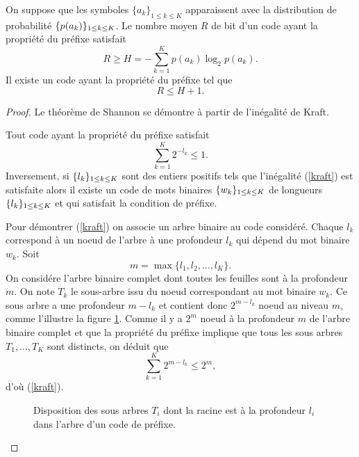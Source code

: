 \begin{theorem} [Shannon]
\label{shan-th}
On suppose que les symboles
$\{a_k\}_{1 \leq k \leq K}$ apparaissent avec la distribution
de probabilit\'e $\{p(a_k)\}_{ 1 \leq k \leq K}$.
Le nombre moyen $R$ de bit d'un code ayant la propri\'et\'e du
pr\'efixe satisfait
\begin{equation}
\label{shan1}
R \geq H = - \sum_{k=1}^K p(a_k) \log_2 p(a_k) .
\end{equation}
Il existe un code ayant la propri\'et\'e du pr\'efixe tel que
\begin{equation}
\label{shan2}
R \leq H + 1.
\end{equation}
\end{theorem}
\begin{proof}
Le th\'eor\`eme de Shannon se d\'emontre \`a partir de
l'in\'egalit\'e de Kraft.

\begin{lemma} 
Tout code ayant la propri\'et\'e du pr\'efixe satisfait
\begin{equation}
\label{kraft}
\sum_{k=1}^K 2^{-l_k} \leq 1 .
\end{equation}
Inversement, si
$\{ l_k \}_{ 1 \leq k \leq K}$ sont des entiers positifs tels que
l'in\'egalit\'e (\ref{kraft}) est satisfaite alors il existe
un code de mots binaires $\{w_k \}_{ 1 \leq k \leq K}$ de longueurs
$\{ l_k \}_{ 1 \leq k \leq K}$ et qui satisfait la condition de pr\'efixe.
\end{lemma}

Pour d\'emontrer (\ref{kraft}) on associe un arbre binaire
au code consid\'er\'e. Chaque $l_k$ correspond \`a un noeud
de l'arbre \`a une profondeur $l_k$ qui d\'epend du mot
binaire $w_k$. Soit
\begin{equation}
\label{mmax}
m = \max \{l_1, l_2, ... , l_K\} .
\end{equation}
On consid\'ere l'arbre binaire complet dont toutes les
feuilles sont \`a la profondeur $m$.
On note $T_k$ le sous-arbre issu du noeud correspondant au
mot binaire $w_k$. Ce sous arbre a une profondeur ${m - l_k}$
et contient donc $2^{m - l_k}$ noeud au niveau $m$, comme
l'illustre la figure \ref{kraft-fig}.
Comme il y a $2^m$ noeud \`a la profondeur $m$ de l'arbre binaire
complet et que
la propri\'et\'e du pr\'efixe implique
que tous les sous arbres $T_1 , ... , T_K$ sont distincts, on
d\'eduit que
\[
\sum_{k=1}^K 2^{m-l_k} \leq 2^m ,
\]
d'o\`u (\ref{kraft}).

\begin{figure}[bhtp]
\centerline{
	\epsfxsize=6cm
	\leavevmode{}}
\caption{Disposition des sous arbres $T_i$ dont la racine est \`a la
profondeur $l_i$ dans l'arbre d'un code de pr\'efixe.}
\label{kraft-fig}
\end{figure}



\end{proof}
